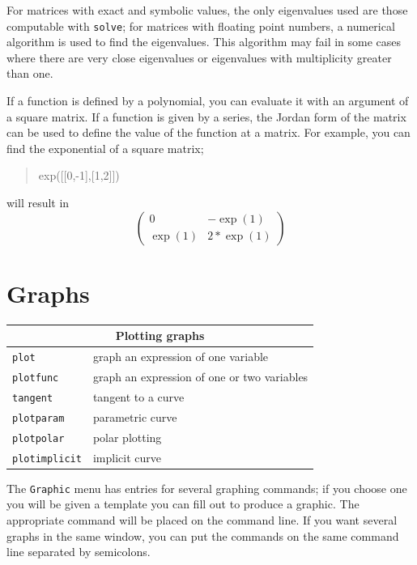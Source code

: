 \documentclass{article}
\newcommand{\xcasin}[1]
{\begin{quote}\ttfamily
#1
\end{quote}}
\newcommand{\xcasout}[1]
{\begin{equation*}
#1
\end{equation*}}
\begin{document}
For matrices with exact and symbolic values, the only eigenvalues used
are those computable with \texttt{solve}; for matrices with floating
point numbers, a numerical algorithm is used to find the eigenvalues.
This algorithm may fail in some cases where there are very close
eigenvalues or eigenvalues with multiplicity greater than one.

If a function is defined by a polynomial, you can evaluate it with an
argument of a square matrix.  If a function is given by a series, the
Jordan form of the matrix can be used to define the value of the
function at a matrix.  For example, you can find the exponential of a
square matrix;
\xcasin{exp([[0,-1],[1,2]])}
will result in
\xcasout{
\begin{pmatrix}
0 & -\exp(1)\\
\exp(1) & 2*\exp(1)
\end{pmatrix}}


\section{Graphs}

\begin{center}
\begin{tabular}{|p{}|p{}|}
\hline
\multicolumn{2}{|c|}{\bf Plotting graphs}\\
\hline\hline
\texttt{plot} & graph an expression of one variable\\
\texttt{plotfunc} & graph an expression of one or two variables\\
\texttt{tangent} & tangent to a curve\\
\texttt{plotparam} & parametric curve\\
\texttt{plotpolar} & polar plotting\\
\texttt{plotimplicit} & implicit curve\\
\hline
\end{tabular}
\end{center}

The \texttt{Graphic} menu has entries for several graphing commands;
if you choose one you will be given a template you can fill out to
produce a graphic.  The appropriate command will be placed on the
command line.  If you want several graphs in the same window, you can
put the commands on the same command line separated by semicolons.
\end{document}
